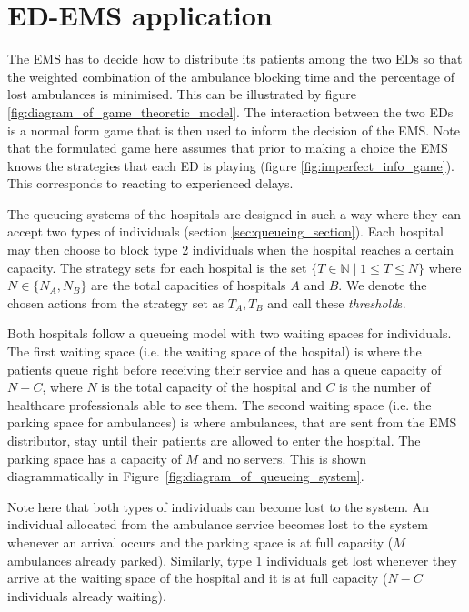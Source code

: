 \section{ED-EMS application}\label{sec:game_ems_es_application}

The EMS has to decide how to distribute its patients among the two EDs so that
the weighted combination of the ambulance blocking time and the percentage of
lost ambulances is minimised.
This can be illustrated by figure \ref{fig:diagram_of_game_theoretic_model}.
The interaction between the two
EDs is a normal form game that is then used to inform the decision of the EMS.
Note that the formulated game here assumes that prior to making a choice the
EMS knows the strategies that each ED is playing (figure
\ref{fig:imperfect_info_game}).
This corresponds to reacting to experienced delays.

The queueing systems of the hospitals are designed in such a way where they can
accept two types of individuals (section \ref{sec:queueing_section}).
Each hospital may then choose to block type 2 individuals
when the hospital reaches a certain capacity.
The strategy sets for each hospital is the set
\( \{T \in \mathbb{N} \;|\; 1 \leq T \leq N\} \) where \(N \in\{N_A, N_B\}\) are
the total capacities of hospitals \(A\) and \(B\).
We denote the chosen actions from the strategy set as \(T_A, T_B\) and call
these \textit{threshold}s.

Both hospitals follow a queueing model with two waiting spaces for
individuals.
The first waiting space (i.e. the waiting space of the hospital) is where the
patients queue right before receiving
their service and has a queue capacity of \( N - C \), where \(N\) is the total
capacity of the hospital and \(C\) is the number of healthcare
professionals able to see them.
The second waiting space (i.e. the parking space for ambulances) is where
ambulances, that are sent from the
EMS distributor, stay until their patients are allowed to enter the hospital.
The parking space has a capacity of \(M\) and no servers.
This is shown diagrammatically in Figure~\ref{fig:diagram_of_queueing_system}.

Note here that both types of individuals can become lost to the system.
An individual allocated from the ambulance service becomes lost to the system
whenever
an arrival occurs and the parking space is at full capacity (\(M\)
ambulances already parked).
Similarly, type 1 individuals get lost whenever they arrive at the waiting
space of the hospital and it is at full capacity (\(N - C\) individuals already
waiting).
